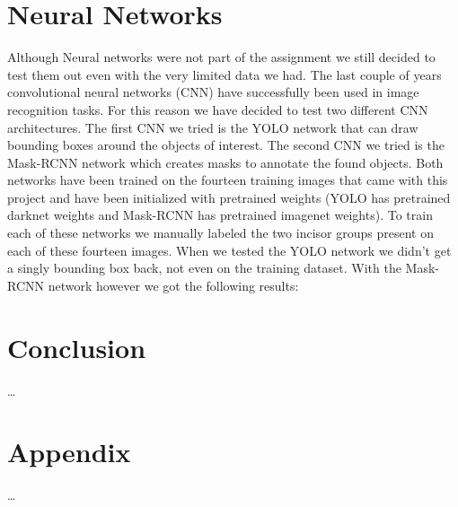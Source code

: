 \documentclass[a4paper]{article}
\begin{document}
\section{Neural Networks}
\label{sect:nns}
Although Neural networks were not part of the assignment we still decided to test them out even with the very limited data we had.
The last couple of years convolutional neural networks (CNN) have successfully been used in image recognition tasks.
For this reason we have decided to test two different CNN architectures.
The first CNN we tried is the YOLO\cite{yolov3} network that can draw bounding boxes around the objects of interest.
The second CNN we tried is the Mask-RCNN\cite{MASK-RCNN} network which creates masks to annotate the found objects.
Both networks have been trained on the fourteen training images that came with this project and have been initialized with pretrained weights (YOLO has pretrained darknet weights and Mask-RCNN has pretrained imagenet weights).
To train each of these networks we manually labeled the two incisor groups present on each of these fourteen images.
When we tested the YOLO network we didn't get a singly bounding box back, not even on the training dataset.
With the Mask-RCNN network however we got the following results:



\section{Conclusion}
\label{sect:conclusion}
\ldots



\newpage
\section{Appendix}
\label{sect:appendix}
\ldots





\end{document}
